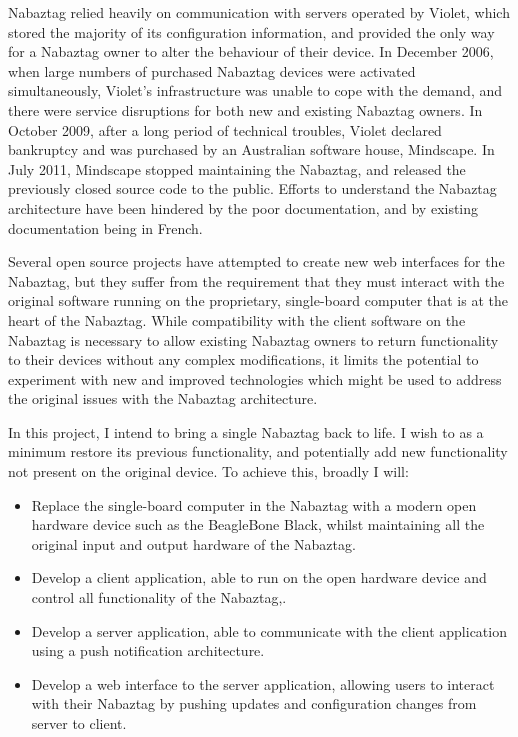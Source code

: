 \documentclass[12pt, a4paper]{article}
\begin{document}
\begin{appendices}
	Nabaztag relied heavily on communication with servers 
	operated by Violet, which stored the majority of its configuration 
	information, and provided the only way for a Nabaztag owner to alter 
	the behaviour of their device. In December 2006, when large numbers of 
	purchased Nabaztag devices were activated simultaneously, Violet's 
	infrastructure was unable to cope with the demand, and there were 
	service disruptions for both new and existing Nabaztag owners. In 
	October 2009, after a long period of technical troubles, Violet 
	declared bankruptcy and was purchased by an Australian software house, 
	Mindscape. In July 2011, Mindscape stopped maintaining the Nabaztag, 
	and released the previously closed source code to the public. Efforts 
	to understand the Nabaztag architecture have been hindered by the 
	poor documentation, and by existing documentation being in French.
	
	Several open source projects have attempted to create new web 
	interfaces for the Nabaztag, but they suffer from the requirement that 
	they must interact with the original software running 
	on the proprietary, single-board computer that is at the heart of the 
	Nabaztag. While compatibility with the client software on the Nabaztag is
	necessary to allow existing Nabaztag owners 
	to return functionality to their devices without any complex modifications,
	it limits the potential to experiment with new and improved technologies 
	which might be used to address the original issues with the Nabaztag architecture.
	
	In this project, I intend to bring a single Nabaztag back to 
	life. I wish to as a minimum restore its previous functionality, and 
	potentially add new functionality not present on the original 
	device. To achieve this, broadly I will:
	
	\begin{itemize}
		\item Replace the single-board computer in the Nabaztag with a modern open 
	hardware device such as the BeagleBone Black, whilst maintaining all 
	the original input and output hardware of the Nabaztag.
		\item Develop a client application, able to run on the open 
	hardware device and control all functionality of the Nabaztag,.
		\item Develop a server application, able to communicate with 
	the client application using a push notification architecture.
		\item Develop a web interface to the server application, 
	allowing users to interact with their Nabaztag by pushing updates and configuration changes from 
	server to client.
	\end{itemize}

\end{appendices}	
\end{document}
